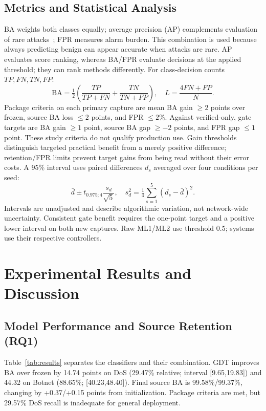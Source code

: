 \documentclass[conference]{IEEEtran}
\begin{document}
\subsection{Metrics and Statistical Analysis}
BA weights both classes equally; average precision (AP) complements evaluation of rare attacks~\cite{saito}; FPR measures alarm burden. This combination is used because always predicting benign can appear accurate when attacks are rare. AP evaluates score ranking, whereas BA/FPR evaluate decisions at the applied threshold; they can rank methods differently. For class-decision counts $TP,FN,TN,FP$:
\begin{equation}
 \mathrm{BA}=\tfrac12\left(\frac{TP}{TP+FN}+\frac{TN}{TN+FP}\right),\quad L=\frac{4FN+FP}{N}.\label{eq:metrics}
\end{equation}
Package criteria on each primary capture are mean BA gain $\ge2$ points over frozen, source BA loss $\le2$ points, and FPR $\le2\%$. Against verified-only, gate targets are BA gain $\ge1$ point, source BA gap $\ge-2$ points, and FPR gap $\le1$ point. These study criteria do not qualify production use. Gain thresholds distinguish targeted practical benefit from a merely positive difference; retention/FPR limits prevent target gains from being read without their error costs. A 95\% interval uses paired differences $d_s$ averaged over four conditions per seed:
\begin{equation}
 \bar d\pm t_{0.975;4}\frac{s_d}{\sqrt5},\quad s_d^2=\tfrac14\sum_{s=1}^5(d_s-\bar d)^2.\label{eq:ci}
\end{equation}
Intervals are unadjusted and describe algorithmic variation, not network-wide uncertainty. Consistent gate benefit requires the one-point target and a positive lower interval on both new captures. Raw ML1/ML2 use threshold 0.5; systems use their respective controllers.

\section{Experimental Results and Discussion}
\subsection{Model Performance and Source Retention (RQ1)}
Table~\ref{tab:results} separates the classifiers and their combination. GDT improves BA over frozen by 14.74 points on DoS (29.47\% relative; interval [9.65,19.83]) and 44.32 on Botnet (88.65\%; [40.23,48.40]). Final source BA is 99.58\%/99.37\%, changing by +0.37/+0.15 points from initialization. Package criteria are met, but 29.57\% DoS recall is inadequate for general deployment.
\end{document}
